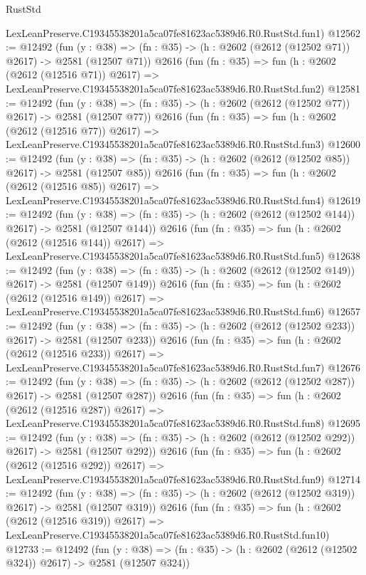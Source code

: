 \begin{lexlean}{RustStd}
\begin{coremodule}
    LexLeanPreserve.C19345538201a5ca07fe81623ac5389d6.R0.RustStd.fun1)
@12562 := @12492
    (fun (y : @38) => (fn : @35) -> (h : @2602 (@2612 (@12502 @71)) @2617) -> @2581 (@12507 @71))
    @2616
    (fun (fn : @35) =>
    fun (h : @2602 (@2612 (@12516 @71)) @2617) =>
    LexLeanPreserve.C19345538201a5ca07fe81623ac5389d6.R0.RustStd.fun2)
@12581 := @12492
    (fun (y : @38) => (fn : @35) -> (h : @2602 (@2612 (@12502 @77)) @2617) -> @2581 (@12507 @77))
    @2616
    (fun (fn : @35) =>
    fun (h : @2602 (@2612 (@12516 @77)) @2617) =>
    LexLeanPreserve.C19345538201a5ca07fe81623ac5389d6.R0.RustStd.fun3)
@12600 := @12492
    (fun (y : @38) => (fn : @35) -> (h : @2602 (@2612 (@12502 @85)) @2617) -> @2581 (@12507 @85))
    @2616
    (fun (fn : @35) =>
    fun (h : @2602 (@2612 (@12516 @85)) @2617) =>
    LexLeanPreserve.C19345538201a5ca07fe81623ac5389d6.R0.RustStd.fun4)
@12619 := @12492
    (fun (y : @38) => (fn : @35) -> (h : @2602 (@2612 (@12502 @144)) @2617) -> @2581 (@12507 @144))
    @2616
    (fun (fn : @35) =>
    fun (h : @2602 (@2612 (@12516 @144)) @2617) =>
    LexLeanPreserve.C19345538201a5ca07fe81623ac5389d6.R0.RustStd.fun5)
@12638 := @12492
    (fun (y : @38) => (fn : @35) -> (h : @2602 (@2612 (@12502 @149)) @2617) -> @2581 (@12507 @149))
    @2616
    (fun (fn : @35) =>
    fun (h : @2602 (@2612 (@12516 @149)) @2617) =>
    LexLeanPreserve.C19345538201a5ca07fe81623ac5389d6.R0.RustStd.fun6)
@12657 := @12492
    (fun (y : @38) => (fn : @35) -> (h : @2602 (@2612 (@12502 @233)) @2617) -> @2581 (@12507 @233))
    @2616
    (fun (fn : @35) =>
    fun (h : @2602 (@2612 (@12516 @233)) @2617) =>
    LexLeanPreserve.C19345538201a5ca07fe81623ac5389d6.R0.RustStd.fun7)
@12676 := @12492
    (fun (y : @38) => (fn : @35) -> (h : @2602 (@2612 (@12502 @287)) @2617) -> @2581 (@12507 @287))
    @2616
    (fun (fn : @35) =>
    fun (h : @2602 (@2612 (@12516 @287)) @2617) =>
    LexLeanPreserve.C19345538201a5ca07fe81623ac5389d6.R0.RustStd.fun8)
@12695 := @12492
    (fun (y : @38) => (fn : @35) -> (h : @2602 (@2612 (@12502 @292)) @2617) -> @2581 (@12507 @292))
    @2616
    (fun (fn : @35) =>
    fun (h : @2602 (@2612 (@12516 @292)) @2617) =>
    LexLeanPreserve.C19345538201a5ca07fe81623ac5389d6.R0.RustStd.fun9)
@12714 := @12492
    (fun (y : @38) => (fn : @35) -> (h : @2602 (@2612 (@12502 @319)) @2617) -> @2581 (@12507 @319))
    @2616
    (fun (fn : @35) =>
    fun (h : @2602 (@2612 (@12516 @319)) @2617) =>
    LexLeanPreserve.C19345538201a5ca07fe81623ac5389d6.R0.RustStd.fun10)
@12733 := @12492
    (fun (y : @38) => (fn : @35) -> (h : @2602 (@2612 (@12502 @324)) @2617) -> @2581 (@12507 @324))

\end{coremodule}
\end{lexlean}
